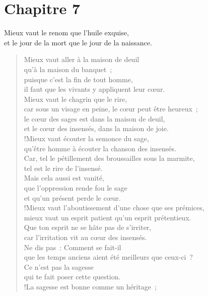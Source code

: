 \documentclass[french,twoside]{book} %
\def\mednobreak{\ifdim\lastskip<\medskipamount
  \removelastskip\nopagebreak\medskip\fi}
\newcommand{\labelblock}[1]{\medbreak{\noindent\color{rubric}\bfseries #1}\par\mednobreak}
\begin{document}
\section[{Chapitre 7}]{Chapitre 7}\renewcommand{\leftmark}{Chapitre 7}


\labelblock{Relativité des biens}

Mieux vaut le renom que l’huile exquise, \\
et le jour de la mort que le jour de la naissance.\\

\begin{verse}
Mieux vaut aller à la maison de deuil \\
qu’à la maison du banquet ; \\
puisque c’est la fin de tout homme, \\
il faut que les vivants y appliquent leur cœur.\\
Mieux vaut le chagrin que le rire, \\
car sous un visage en peine, le cœur peut être heureux ;\\
le cœur des sages est dans la maison de deuil, \\
et le cœur des insensés, dans la maison de joie.\\!Mieux vaut écouter la semonce du sage, \\
qu’être homme à écouter la chanson des insensés.\\
Car, tel le pétillement des broussailles sous la marmite, \\
tel est le rire de l’insensé. \\
Mais cela aussi est vanité,\\
que l’oppression rende fou le sage \\
et qu’un présent perde le cœur.\\!Mieux vaut l’aboutissement d’une chose que ses prémices, \\
mieux vaut un esprit patient qu’un esprit prétentieux.\\
Que ton esprit ne se hâte pas de s’irriter, \\
car l’irritation vit au cœur des insensés.\\
Ne dis pas : Comment se fait-il \\
que les temps anciens aient été meilleurs que ceux-ci ? \\
Ce n’est pas la sagesse \\
qui te fait poser cette question.\\!La sagesse est bonne comme un héritage ; \\

\end{verse}
\end{document}
